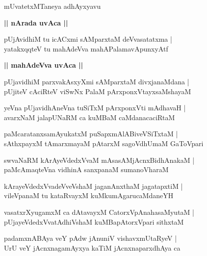 \documentclass[twoside,12pt,openright]{book}
\newcounter{shloka}[chapter]
\def\uvaca#1{\centerline{{\large\textbf{#1}}}}
\begin{document}
\begin{center}
mUvatetxMTaneya adhAyxyavu
\end{center}

\uvaca{|| nArada uvAca ||}

\begin{shloka}%
pUjAvidhiM tu icACxmi sAMparxtaM deVvasatatxma |\\
yatakxqqteV tu mahAdeVva mahAPalamavApunxyAtf
\end{shloka}

\uvaca{|| mahAdeVva uvAca ||}

\begin{shloka}%
pUjavidhiM parxvakAsxyXmi sAMparxtaM divxjanaMdana |\\
pUjiteV cAciRteV viSwNx PalaM pArxponxVtayxsaMshayaM 
\end{shloka}

\begin{shloka}%
yeVna pUjavidhAneVna tuSiTxM pArxponxVti mAdhavaH |\\
avarxNaM jalapUNaRM ca kuMBaM caMdanacaciRtaM
\end{shloka}

\begin{shloka}%
paMcaratanxsamAyukatxM puSapxmAlABiveVSiTxtaM |\\
sAthxpayxM tAmarxmayaM pAtarxM sagoVdhUmaM GaToVpari
\end{shloka}

\begin{shloka}%
swvaNaRM kArAyeVdedxVvaM mAsasAMjAcnxBidhAnakaM |\\
paMcAmaqteVna vidhinA sanxpanaM sumanoVharaM
\end{shloka}

\begin{shloka}%
kArayeVdedxVvadeVveVshaM jaganAnxthaM jagatapxtiM |\\
vileVpanaM tu kataRvayxM kuMkumAgarucaMdaneYH 
\end{shloka}

\begin{shloka}%
vasatxrXyugamxM ca dAtavayxM CatorxVpAnahasaMyutaM |\\
pUjayeVdedxVvatAdhiVshaM kuMBapAtorxVpari sithxtaM 
\end{shloka}

\begin{shloka}%
padamxnABAya veY pAdw jAnuniV vishavxmUtaRyeV |\\
UrU veY jAcnxnagamAyxya kaTiM jAcnxnaparxdhAya ca 
\end{shloka}
\end{document}
